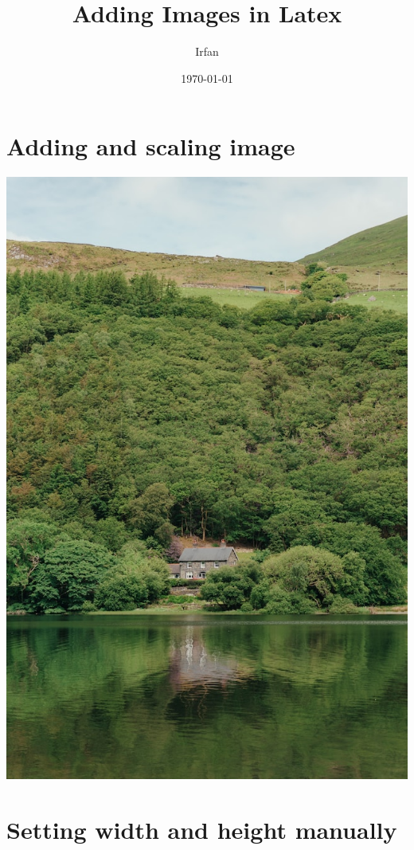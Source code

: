 \documentclass{article}
\title{Adding Images in Latex}
\author{Irfan}
\date{\today}
\begin{document}
\maketitle

\listoffigures %
\listoftables %

\section{Adding and scaling image}
\includegraphics[scale=0.2]{shawnanggg-SQ9Q1nvwhlI-unsplash.jpg}

\section{Setting width and height manually}
\end{document}
